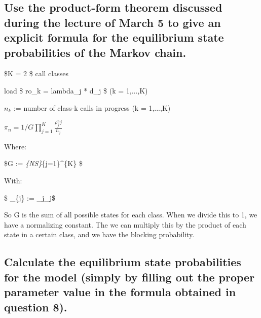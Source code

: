 \documentclass[11pt]{article}
\begin{document}
    

    \subsection{Use the product-form theorem discussed during the lecture of
March 5 to give an explicit formula for the equilibrium state
probabilities of the Markov
chain.}\label{use-the-product-form-theorem-discussed-during-the-lecture-of-march-5-to-give-an-explicit-formula-for-the-equilibrium-state-probabilities-of-the-markov-chain.}

    \$K = 2 \$ call classes

load \$ ro\_k = lambda\_j * d\_j \$ (k = 1,...,K)

\(n_k\) := number of class-k calls in progress (k = 1,...,K)

\(\pi_n = 1/G \prod_{j=1}^{K} \frac{\rho_{j}^nj}{n_{j}}\)

Where:

\$G := \sum\emph{\{N\in S\}\prod}\{j=1\}\^{}\{K\}
 \$

With:

\$ \rho\_\{j\} := \lambda\_j\delta\_j\$

So G is the sum of all possible states for each class. When we divide
this to 1, we have a normalizing constant. The we can multiply this by
the product of each state in a certain class, and we have the blocking
probability.

    

    \subsection{Calculate the equilibrium state probabilities for the model
(simply by filling out the proper parameter value in the formula
obtained in question
8).}\label{calculate-the-equilibrium-state-probabilities-for-the-model-simply-by-filling-out-the-proper-parameter-value-in-the-formula-obtained-in-question-8.}
\end{document}
